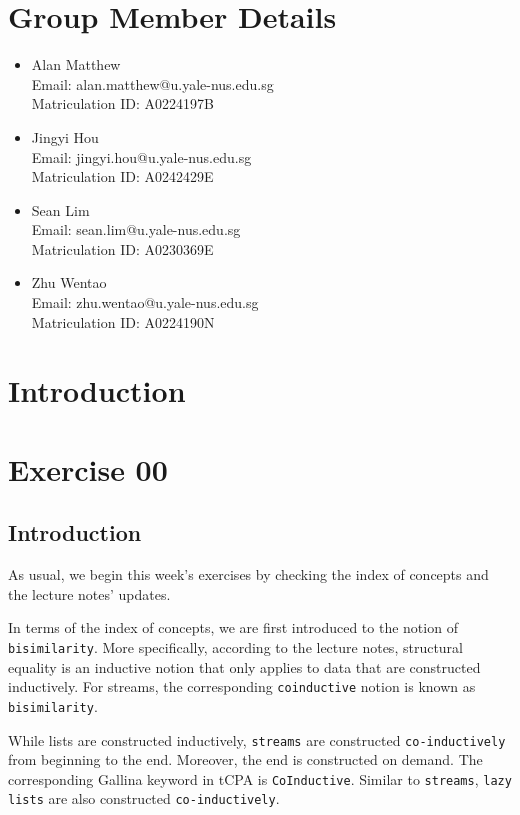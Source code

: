 \documentclass{article}
\begin{document}
\section*{Group Member Details}
\begin{itemize}
    \item Alan Matthew \\
    Email: alan.matthew@u.yale-nus.edu.sg \\
    Matriculation ID: A0224197B

    \item Jingyi Hou \\
    Email: jingyi.hou@u.yale-nus.edu.sg \\
    Matriculation ID: A0242429E

    \item Sean Lim \\
    Email: sean.lim@u.yale-nus.edu.sg \\
    Matriculation ID: A0230369E

    \item Zhu Wentao \\
    Email: zhu.wentao@u.yale-nus.edu.sg \\
    Matriculation ID: A0224190N
\end{itemize}
\newpage
\tableofcontents
\newpage

\section{Introduction}

\section{Exercise 00}

\subsection{Introduction}
As usual, we begin this week's exercises by checking the index of concepts and the lecture notes' updates.

In terms of the index of concepts, we are first introduced to the notion of \texttt{bisimilarity}. More specifically, according to the lecture notes, structural equality is an inductive notion that only applies to data that are constructed inductively. For streams, the corresponding \texttt{coinductive} notion is known as \texttt{bisimilarity}. 

While lists are constructed inductively, \texttt{streams} are constructed \texttt{co-inductively} from beginning to the end. Moreover, the end is constructed on demand. The corresponding Gallina keyword in tCPA is \texttt{CoInductive}. Similar to \texttt{streams}, \texttt{lazy lists} are also constructed \texttt{co-inductively}.
\end{document}
